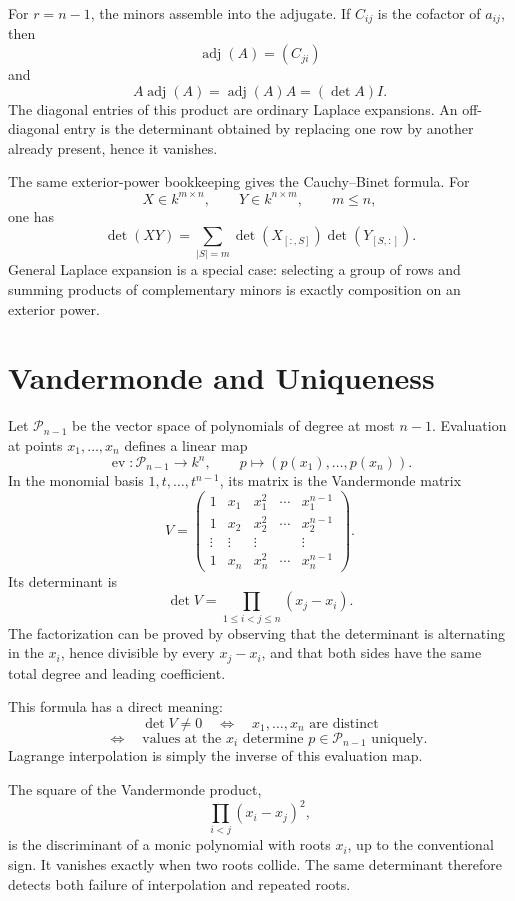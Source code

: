 For \(r=n-1\), the minors assemble into the adjugate.  If \(C_{ij}\) is the cofactor of \(a_{ij}\), then
\[
  \operatorname{adj}(A)=(C_{ji})
\]
and
\[
  A\operatorname{adj}(A)
  =\operatorname{adj}(A)A
  =(\det A)I.
\]
The diagonal entries of this product are ordinary Laplace expansions.  An off-diagonal entry is the determinant obtained by replacing one row by another already present, hence it vanishes.

The same exterior-power bookkeeping gives the Cauchy--Binet formula.  For
\[
  X\in k^{m\times n},
  \qquad
  Y\in k^{n\times m},
  \qquad m\le n,
\]
one has
\[
  \boxed{
  \det(XY)
  =\sum_{|S|=m}\det(X_{[:,S]})\det(Y_{[S,:]}).}
\]
General Laplace expansion is a special case: selecting a group of rows and summing products of complementary minors is exactly composition on an exterior power.

\section{Vandermonde and Uniqueness}

Let \(\mathcal P_{n-1}\) be the vector space of polynomials of degree at most \(n-1\).  Evaluation at points \(x_1,\ldots,x_n\) defines a linear map
\[
  \operatorname{ev}:\mathcal P_{n-1}\longrightarrow k^n,
  \qquad
  p\longmapsto(p(x_1),\ldots,p(x_n)).
\]
In the monomial basis \(1,t,\ldots,t^{n-1}\), its matrix is the Vandermonde matrix
\[
  V=
  \begin{pmatrix}
    1&x_1&x_1^2&\cdots&x_1^{n-1}\\
    1&x_2&x_2^2&\cdots&x_2^{n-1}\\
    \vdots&\vdots&\vdots&&\vdots\\
    1&x_n&x_n^2&\cdots&x_n^{n-1}
  \end{pmatrix}.
\]
Its determinant is
\[
  \boxed{
  \det V=\prod_{1\le i<j\le n}(x_j-x_i).}
\]
The factorization can be proved by observing that the determinant is alternating in the \(x_i\), hence divisible by every \(x_j-x_i\), and that both sides have the same total degree and leading coefficient.

This formula has a direct meaning:
\[
  \det V\ne0
  \quad\Longleftrightarrow\quad
  x_1,\ldots,x_n\text{ are distinct}
\]
\[
  \quad\Longleftrightarrow\quad
  \text{values at the }x_i\text{ determine }p\in\mathcal P_{n-1}\text{ uniquely}.
\]
Lagrange interpolation is simply the inverse of this evaluation map.

The square of the Vandermonde product,
\[
  \prod_{i<j}(x_i-x_j)^2,
\]
is the discriminant of a monic polynomial with roots \(x_i\), up to the conventional sign.  It vanishes exactly when two roots collide.  The same determinant therefore detects both failure of interpolation and repeated roots.

